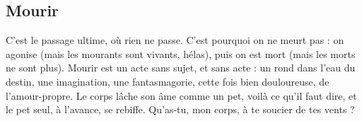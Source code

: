 \subsection{Mourir}
C'est le passage ultime, où rien ne passe. C’est pourquoi on ne
meurt pas : on agonise (mais les mourants sont vivants, hélas),
puis on est mort (mais les morts ne sont plus). Mourir est un acte sans sujet, et
sans acte : un rond dans l’eau du destin, une imagination, une fantasmagorie,
cette fois bien douloureuse, de l'amour-propre. Le corps lâche son âme comme
un pet, voilà ce qu’il faut dire, et le pet seul, à l’avance, se rebiffe. Qu’as-tu,
mon corps, à te soucier de tes vents ?
